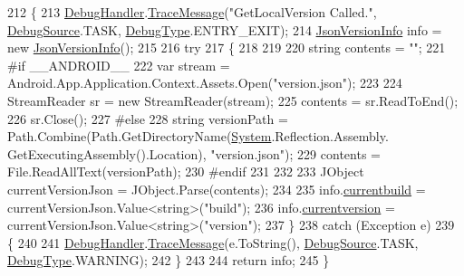 \begin{DoxyCode}
212         \{
213             \mbox{\hyperlink{class_little_weeb_library_1_1_handlers_1_1_version_handler_a9d4e181ca6b1efff96f530dd7981d6e3}{DebugHandler}}.\mbox{\hyperlink{interface_little_weeb_library_1_1_handlers_1_1_i_debug_handler_a2e405bc3492e683cd3702fae125221bc}{TraceMessage}}(\textcolor{stringliteral}{"GetLocalVersion Called."}, 
      \mbox{\hyperlink{namespace_little_weeb_library_1_1_handlers_a2a6ca0775121c9c503d58aa254d292be}{DebugSource}}.TASK, \mbox{\hyperlink{namespace_little_weeb_library_1_1_handlers_ab66019ed40462876ec4e61bb3ccb0a62}{DebugType}}.ENTRY\_EXIT);
214             \mbox{\hyperlink{class_little_weeb_library_1_1_models_1_1_json_version_info}{JsonVersionInfo}} info = \textcolor{keyword}{new} \mbox{\hyperlink{class_little_weeb_library_1_1_models_1_1_json_version_info}{JsonVersionInfo}}();
215 
216             \textcolor{keywordflow}{try}
217             \{
218 
219 
220                 \textcolor{keywordtype}{string} contents = \textcolor{stringliteral}{""};
221 \textcolor{preprocessor}{#if \_\_ANDROID\_\_               }
222                 var stream = Android.App.Application.Context.Assets.Open(\textcolor{stringliteral}{"version.json"});
223 
224                 StreamReader sr = \textcolor{keyword}{new} StreamReader(stream);
225                 contents = sr.ReadToEnd();
226                 sr.Close();
227 \textcolor{preprocessor}{#else}
228                 \textcolor{keywordtype}{string} versionPath = Path.Combine(Path.GetDirectoryName(\mbox{\hyperlink{namespace_system}{System}}.Reflection.Assembly.
      GetExecutingAssembly().Location), \textcolor{stringliteral}{"version.json"});
229                 contents = File.ReadAllText(versionPath);
230 \textcolor{preprocessor}{#endif}
231 
232 
233                 JObject currentVersionJson = JObject.Parse(contents);
234 
235                 info.\mbox{\hyperlink{class_little_weeb_library_1_1_models_1_1_json_version_info_adb75e140a3dcc76b8ca6c1dd3c0f060a}{currentbuild}} = currentVersionJson.Value<\textcolor{keywordtype}{string}>(\textcolor{stringliteral}{"build"});
236                 info.\mbox{\hyperlink{class_little_weeb_library_1_1_models_1_1_json_version_info_a9a74ca950016eb93a1ecb4d9089d9f2c}{currentversion}} = currentVersionJson.Value<\textcolor{keywordtype}{string}>(\textcolor{stringliteral}{"version"});
237             \}
238             \textcolor{keywordflow}{catch} (Exception e)
239             \{
240 
241                 \mbox{\hyperlink{class_little_weeb_library_1_1_handlers_1_1_version_handler_a9d4e181ca6b1efff96f530dd7981d6e3}{DebugHandler}}.\mbox{\hyperlink{interface_little_weeb_library_1_1_handlers_1_1_i_debug_handler_a2e405bc3492e683cd3702fae125221bc}{TraceMessage}}(e.ToString(), 
      \mbox{\hyperlink{namespace_little_weeb_library_1_1_handlers_a2a6ca0775121c9c503d58aa254d292be}{DebugSource}}.TASK, \mbox{\hyperlink{namespace_little_weeb_library_1_1_handlers_ab66019ed40462876ec4e61bb3ccb0a62}{DebugType}}.WARNING);
242             \}
243            
244             \textcolor{keywordflow}{return} info;
245         \}
\end{DoxyCode}
